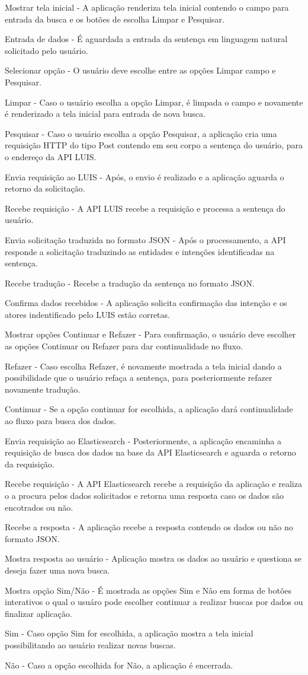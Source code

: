 	Mostrar tela inicial - A aplicação renderiza tela inicial contendo o campo para entrada da busca e os botões de escolha Limpar e Pesquisar.

	Entrada de dados - É aguardada a entrada da sentença em linguagem natural solicitado pelo usuário.

	Selecionar opção - O usuário deve escolhe entre as opções Limpar campo e Pesquisar.

	Limpar - Caso o usuário escolha a opção Limpar, é limpada o campo e novamente é renderizado a tela inicial para entrada de nova busca.

	Pesquisar - Caso o usuário escolha a opção Pesquisar, a aplicação cria uma requisição HTTP do tipo Post contendo em seu corpo a sentença do usuário, para o endereço da API LUIS.

	Envia requisição ao LUIS - Após, o envio é realizado e a aplicação aguarda o retorno da solicitação.

	Recebe requisição - A API LUIS recebe a requisição e processa a sentença do usuário.

	Envia solicitação traduzida no formato JSON - Após o processamento, a API responde a solicitação traduzindo as entidades e intenções identificadas na sentença.

	Recebe tradução - Recebe a tradução da sentença no formato JSON.

	Confirma dados recebidos - A aplicação solicita confirmação das intenção e os atores indentificado pelo LUIS estão corretas.

	Mostrar opções Continuar e Refazer - Para confirmação, o usuário deve escolher as opções Continuar ou Refazer para dar continualidade no fluxo.

	Refazer - Caso escolha Refazer, é novamente mostrada a tela inicial dando a possibilidade que o usuário refaça a sentença, para posteriormente refazer novamente tradução.

	Continuar - Se a opção continuar for escolhida, a aplicação dará continualidade ao fluxo para busca dos dados.

	Envia requisição ao Elasticsearch - Posteriormente, a aplicação encaminha a requisição  de busca dos dados na base da API Elasticsearch e aguarda o retorno da requisição.

	Recebe requisição - A API Elasticsearch recebe a requisição da aplicação e realiza o a procura pelos dados solicitados e retorna uma resposta caso os dados são encotrados ou não.

	Recebe a resposta - A aplicação recebe a resposta contendo os dados ou não no formato JSON.

	Mostra resposta ao usuário - Aplicação mostra os dados ao usuário e questiona se deseja fazer uma nova busca.

	Mostra opção Sim/Não - É mostrada as opções Sim e Nâo em forma de botões interativos o qual o usuáro pode escolher continuar a realizar buscas por dados ou finalizar aplicação.

	Sim - Caso opção Sim for escolhida, a aplicação mostra a tela inicial possibilitando ao usuário realizar novas buscas.

	Não - Caso a opção escolhida for Não, a aplicação é encerrada.
